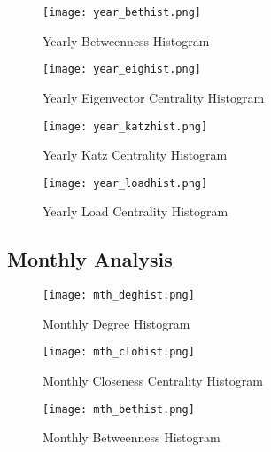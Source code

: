 \begin{figure}[H]
    \centering
    \texttt{[image: year\_bethist.png]}
    \caption{Yearly Betweenness Histogram}
    \label{fig:Yearly Betweenness Centrality Histogram}
\end{figure}

\begin{figure}[H]
    \centering
    \texttt{[image: year\_eighist.png]}
    \caption{Yearly Eigenvector Centrality Histogram}
    \label{fig:Yearly Eigenvector Centrality Histogram}
\end{figure}

\begin{figure}[H]
    \centering
    \texttt{[image: year\_katzhist.png]}
    \caption{Yearly Katz Centrality Histogram}
    \label{fig:Yearly Katz Centrality Histogram}
\end{figure}

\begin{figure}[H]
    \centering
    \texttt{[image: year\_loadhist.png]}
    \caption{Yearly Load Centrality Histogram}
    \label{fig:Yearly Load Centrality Histogram}
\end{figure}

\subsection{Monthly Analysis}
\begin{figure}[H]
    \centering
    \texttt{[image: mth\_deghist.png]}
    \caption{Monthly Degree Histogram}
    \label{fig:Monthly Degree Histogram}
\end{figure}

\begin{figure}[H]
    \centering
    \texttt{[image: mth\_clohist.png]}
    \caption{Monthly Closeness Centrality Histogram}
    \label{fig:Monthly Closeness Centrality Histogram}
\end{figure}

\begin{figure}[H]
    \centering
    \texttt{[image: mth\_bethist.png]}
    \caption{Monthly Betweenness Histogram}
    \label{fig:Monthly Betweenness Centrality Histogram}
\end{figure}

